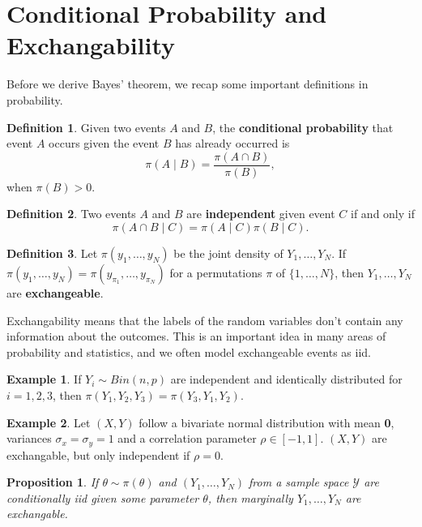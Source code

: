 \documentclass[
]{book}
\newtheorem{proposition}{Proposition}[chapter]
\theoremstyle{definition}
\newtheorem{definition}{Definition}[chapter]
\theoremstyle{definition}
\newtheorem{example}{Example}[chapter]
\theoremstyle{definition}
\theoremstyle{definition}
\theoremstyle{remark}
\begin{document}
\hypertarget{conditional-probability-and-exchangability}{%
\section{Conditional Probability and Exchangability}\label{conditional-probability-and-exchangability}}

Before we derive Bayes' theorem, we recap some important definitions in probability.

\begin{definition}
Given two events \(A\) and \(B\), the \textbf{conditional probability} that event \(A\) occurs given the event \(B\) has already occurred is
\[
\pi(A \mid B) = \frac{\pi(A \cap B)}{\pi(B)}, 
\]
when \(\pi(B) > 0\).
\end{definition}

\begin{definition}
Two events \(A\) and \(B\) are \textbf{independent} given event \(C\) if and only if
\[ \pi(A \cap B \mid C) = \pi(A \mid C)\pi(B \mid C).\]
\end{definition}

\begin{definition}
Let \(\pi(y_1, \ldots, y_N)\) be the joint density of \(Y_1, \ldots, Y_N\). If \(\pi(y_1, \ldots, y_N) = \pi(y_{\pi_1}, \ldots, y_{\pi_N})\) for a permutations \(\pi\) of \(\{1, \ldots, N\}\), then \(Y_1, \ldots, Y_N\) are \textbf{exchangeable}.
\end{definition}

Exchangability means that the labels of the random variables don't contain any information about the outcomes. This is an important idea in many areas of probability and statistics, and we often model exchangeable events as iid.

\begin{example}
If \(Y_i \sim Bin(n, p)\) are independent and identically distributed for \(i = 1, 2, 3\), then \(\pi(Y_1, Y_2, Y_3) = \pi(Y_3, Y_1, Y_2)\).
\end{example}

\begin{example}
Let \((X, Y)\) follow a bivariate normal distribution with mean \textbf{0}, variances \(\sigma_x = \sigma_y = 1\) and a correlation parameter \(\rho \in [-1, 1]\). \((X, Y)\) are exchangable, but only independent if \(\rho = 0\).
\end{example}

\begin{proposition}
If \(\theta \sim \pi(\theta)\) and \((Y_1, \ldots, Y_N)\) from a sample space \(\mathcal{Y}\) are conditionally iid given some parameter \(\theta\), then marginally \(Y_1, \ldots, Y_N\) are exchangable.
\end{proposition}
\end{document}
